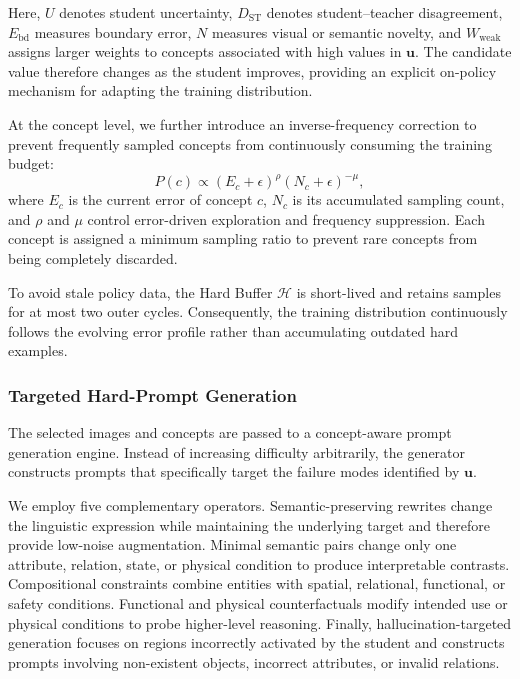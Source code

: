 Here, $U$ denotes student uncertainty, $D_{\mathrm{ST}}$ denotes
student--teacher disagreement, $E_{\mathrm{bd}}$ measures boundary error,
$N$ measures visual or semantic novelty, and $W_{\mathrm{weak}}$ assigns
larger weights to concepts associated with high values in $\mathbf{u}$.
The candidate value therefore changes as the student improves, providing
an explicit on-policy mechanism for adapting the training distribution.

At the concept level, we further introduce an inverse-frequency correction
to prevent frequently sampled concepts from continuously consuming the
training budget:
\begin{equation}
P(c)
\propto
(E_c+\epsilon)^{\rho}
(N_c+\epsilon)^{-\mu},
\label{eq:concept_sampling}
\end{equation}
where $E_c$ is the current error of concept $c$, $N_c$ is its accumulated
sampling count, and $\rho$ and $\mu$ control error-driven exploration and
frequency suppression. Each concept is assigned a minimum sampling ratio
to prevent rare concepts from being completely discarded.

To avoid stale policy data, the Hard Buffer $\mathcal{H}$ is short-lived
and retains samples for at most two outer cycles. Consequently, the
training distribution continuously follows the evolving error profile
rather than accumulating outdated hard examples.

\subsubsection{Targeted Hard-Prompt Generation}
\label{subsec:hard_prompt}

The selected images and concepts are passed to a concept-aware prompt
generation engine. Instead of increasing difficulty arbitrarily, the
generator constructs prompts that specifically target the failure modes
identified by $\mathbf{u}$.

We employ five complementary operators. Semantic-preserving rewrites
change the linguistic expression while maintaining the underlying target
and therefore provide low-noise augmentation. Minimal semantic pairs
change only one attribute, relation, state, or physical condition to
produce interpretable contrasts. Compositional constraints combine
entities with spatial, relational, functional, or safety conditions.
Functional and physical counterfactuals modify intended use or physical
conditions to probe higher-level reasoning. Finally, hallucination-targeted
generation focuses on regions incorrectly activated by the student and
constructs prompts involving non-existent objects, incorrect attributes,
or invalid relations.

